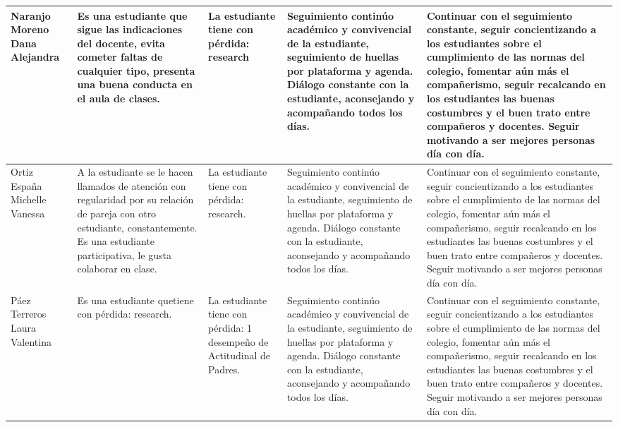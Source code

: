 \documentclass[spanish,11pt,a4paper]{article}
\begin{document}
\begin{longtable}{|p{3.5cm}|p{3.5cm}|p{3.5cm}|p{3.5cm}|p{3.5cm}|}
		Naranjo Moreno Dana Alejandra & 
		Es una estudiante que sigue las indicaciones del docente, evita cometer faltas de cualquier tipo, presenta una buena conducta en el aula de clases. & 
		La estudiante tiene con pérdida:  research & 
		Seguimiento continúo académico y convivencial de la estudiante, seguimiento de huellas por plataforma y agenda. Diálogo constante con la estudiante, aconsejando y acompañando todos los días. & 
		Continuar con el seguimiento constante, seguir concientizando a los estudiantes sobre el cumplimiento de las normas del colegio, fomentar aún más el compañerismo, seguir recalcando en los estudiantes las buenas costumbres y el buen trato entre compañeros y docentes. Seguir motivando a ser mejores personas día con día.\\
		\hline
		
		Ortiz España Michelle Vanessa & 
		A la estudiante se le hacen llamados de atención con regularidad por su relación de pareja con otro estudiante, constantemente. Es una estudiante participativa, le gusta colaborar en clase. & 
		La estudiante tiene con pérdida: research.& 
		Seguimiento continúo académico y convivencial de la estudiante, seguimiento de huellas por plataforma y agenda. Diálogo constante con la estudiante, aconsejando y acompañando todos los días. & 
		Continuar con el seguimiento constante, seguir concientizando a los estudiantes sobre el cumplimiento de las normas del colegio, fomentar aún más el compañerismo, seguir recalcando en los estudiantes las buenas costumbres y el buen trato entre compañeros y docentes. Seguir motivando a ser mejores personas día con día.\\
		\hline
		
		Páez Terreros Laura Valentina & 
		Es una estudiante quetiene con pérdida: research. & 
		La estudiante tiene con pérdida: 1 desempeño de Actitudinal de Padres. & 
		Seguimiento continúo académico y convivencial de la estudiante, seguimiento de huellas por plataforma y agenda. Diálogo constante con la estudiante, aconsejando y acompañando todos los días. & 
		Continuar con el seguimiento constante, seguir concientizando a los estudiantes sobre el cumplimiento de las normas del colegio, fomentar aún más el compañerismo, seguir recalcando en los estudiantes las buenas costumbres y el buen trato entre compañeros y docentes. Seguir motivando a ser mejores personas día con día.\\
		\hline
		

\end{longtable}
\end{document}
